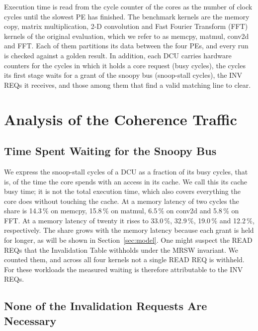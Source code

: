 \documentclass[conference]{IEEEtran}
\begin{document}
Execution time is read from the cycle counter of the cores as the number of
clock cycles until the slowest PE has finished. The benchmark kernels are the
memory copy, matrix multiplication, 2-D convolution and Fast Fourier
Transform (FFT) kernels of the original evaluation, which we refer to as
memcpy, matmul, conv2d and FFT. Each of them partitions its data between the
four PEs, and every run is checked against a golden result. In addition, each
DCU carries hardware counters for the cycles in which it holds a core request
(busy cycles), the cycles its first stage waits for a grant of the snoopy bus
(snoop-stall cycles), the INV REQs it receives, and those among them that
find a valid matching line to clear.

\section{Analysis of the Coherence Traffic}
\label{sec:measure}

\subsection{Time Spent Waiting for the Snoopy Bus}

We express the snoop-stall cycles of a DCU as a fraction of its busy cycles,
that is, of the time the core spends with an access in its cache. We call this
its cache busy time; it is not the total execution time, which also covers
everything the core does without touching the cache. At a memory latency of
two cycles the share is 14.3\,\% on memcpy,
15.8\,\% on matmul, 6.5\,\% on conv2d and 5.8\,\% on FFT. At a memory latency
of twenty it rises to 33.0\,\%, 32.9\,\%, 19.0\,\% and 12.2\,\%,
respectively. The share grows with the memory latency because each grant is
held for longer, as will be shown in Section~\ref{sec:model}. One might
suspect the READ REQs that the Invalidation Table withholds under the MRSW
invariant. We counted them, and across all four kernels not a single
READ REQ is withheld. For these workloads the measured waiting is therefore
attributable to the INV REQs.

\subsection{None of the Invalidation Requests Are Necessary}
\end{document}
